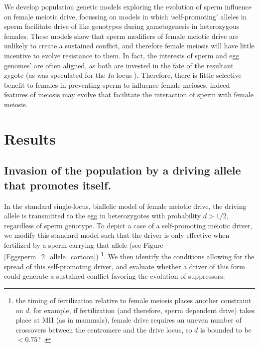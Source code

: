\documentclass[12pt,letterpaper]{article}
\begin{document}
We develop population genetic models exploring the evolution of sperm influence on female meiotic drive, focussing on models in which `self-promoting' alleles in sperm facilitate drive of like genotypes during gametogenesis in heterozygous females.  
These models show that sperm modifiers of female meiotic drive are
unlikely to create a sustained conflict, and therefore 
female meiosis will have little incentive to evolve resistance to them.
In fact, the interests of sperm and egg  genomes' are often aligned, as both are invested in the fate of the resultant zygote (as was speculated for the \emph{In} locus \citep{Pomiankowski1993}).
Therefore, there is little selective benefit to females in preventing sperm to influence female meioses,
	indeed features of meiosis may evolve that facilitate the interaction of sperm with female meiosis. 

\section*{Results}

\subsection*{ Invasion of the population by a driving allele that promotes
itself.}

In the standard single-locus, biallelic model of female meiotic drive,
the driving allele is transmitted to the egg  in heterozygotes with
probability  $d > 1/2$, regardless of sperm genotype. To depict a case
of a self-promoting meiotic driver,  we modify this standard model such 
	that the driver is only effective when fertilized by a sperm carrying that allele (see Figure \ref{Eggsperm_2_allele_cartoon})
\footnote{the timing of fertilization relative to female meiosis places another constraint on $d$, for example, if fertilization (and therefore, sperm dependent drive) takes place at MII (as in mammals),
	female drive requires an uneven number of crossovers between the centromere and the drive locus, 
	so $d$ is bounded to be $<0.75$? \citep[see ][ for
        discussion]{Buckler1999}. }. %
We then identify the conditions allowing for the spread of this self-promoting driver, 
	and evaluate whether a driver of this form could generate a sustained conflict favoring the evolution of suppressors. 
\end{document}
